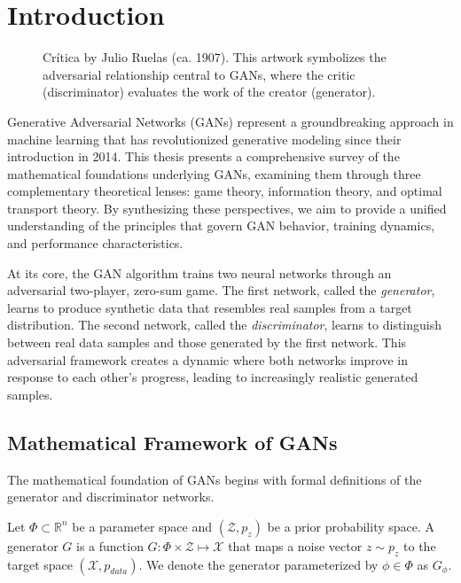 \section{Introduction}%
\setcounter{page}{1}
\vspace{0.5cm}
\begin{figure}[h]
  \label{fig:paradise}
  \centering
  \caption{Crítica by Julio Ruelas (ca. 1907). This artwork symbolizes the adversarial relationship central to GANs, where the critic (discriminator) evaluates the work of the creator (generator).}
\end{figure}
\vspace{0.5cm}

Generative Adversarial Networks (GANs) represent a groundbreaking approach in machine learning that has revolutionized generative modeling since their introduction in 2014. This thesis presents a comprehensive survey of the mathematical foundations underlying GANs, examining them through three complementary theoretical lenses: game theory, information theory, and optimal transport theory. By synthesizing these perspectives, we aim to provide a unified understanding of the principles that govern GAN behavior, training dynamics, and performance characteristics.

At its core, the GAN algorithm trains two neural networks through an adversarial two-player, zero-sum game. The first network, called the \textit{generator}, learns to produce synthetic data that resembles real samples from a target distribution. The second network, called the \textit{discriminator}, learns to distinguish between real data samples and those generated by the first network. This adversarial framework creates a dynamic where both networks improve in response to each other's progress, leading to increasingly realistic generated samples.

\subsection{Mathematical Framework of GANs}

The mathematical foundation of GANs begins with formal definitions of the generator and discriminator networks.

\begin{definition}%
  \label{def:generator}
  Let $\Phi \subset \mathbb{R}^n$ be a parameter space and $(\mathcal{Z}, p_z)$ be a prior probability space. A \textnormal{\sffamily generator} $G$ is a function $G: \Phi \times \mathcal{Z} \mapsto \mathcal{X}$ that maps a noise vector $z \sim p_z$ to the target space $(\mathcal{X}, p_{data})$. We denote the generator parameterized by $\phi \in \Phi$ as $G_\phi$.
\end{definition}

